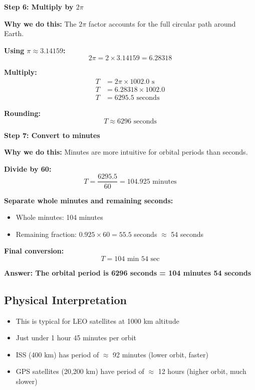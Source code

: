 \documentclass[11pt,letterpaper]{article}
\begin{document}
\vspace{0.3cm}

\textbf{Step 6: Multiply by $2\pi$}

\textbf{Why we do this:} The $2\pi$ factor accounts for the full circular path around Earth.

\textbf{Using $\pi \approx 3.14159$:}
\begin{equation}
2\pi = 2 \times 3.14159 = 6.28318
\end{equation}

\textbf{Multiply:}
\begin{align}
T &= 2\pi \times 1002.0 \text{ s} \\
T &= 6.28318 \times 1002.0 \\
T &= 6295.5 \text{ seconds}
\end{align}

\textbf{Rounding:}
\begin{equation}
T \approx 6296 \text{ seconds}
\end{equation}

\vspace{0.3cm}

\textbf{Step 7: Convert to minutes}

\textbf{Why we do this:} Minutes are more intuitive for orbital periods than seconds.

\textbf{Divide by 60:}
\begin{equation}
T = \frac{6295.5}{60} = 104.925 \text{ minutes}
\end{equation}

\textbf{Separate whole minutes and remaining seconds:}
\begin{itemize}
    \item Whole minutes: 104 minutes
    \item Remaining fraction: $0.925 \times 60 = 55.5$ seconds $\approx$ 54 seconds
\end{itemize}

\textbf{Final conversion:}
\begin{equation}
T = 104 \text{ min } 54 \text{ sec}
\end{equation}

\vspace{0.3cm}

\textbf{Answer: The orbital period is 6296 seconds = 104 minutes 54 seconds}

\subsection{Physical Interpretation}
\begin{itemize}
    \item This is typical for LEO satellites at 1000 km altitude
    \item Just under 1 hour 45 minutes per orbit
    \item ISS (400 km) has period of $\approx$ 92 minutes (lower orbit, faster)
    \item GPS satellites (20,200 km) have period of $\approx$ 12 hours (higher orbit, much slower)
\end{itemize}
\end{document}
